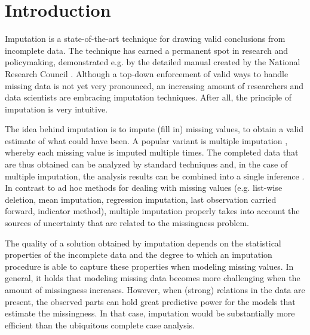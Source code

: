 \documentclass[bimj,fleqn]{w-art}
\begin{document}






\section{Introduction}

Imputation is a state-of-the-art technique for drawing valid conclusions from incomplete data. The technique has earned a permanent spot in research and policymaking, demonstrated e.g. by the detailed manual created by the National Research Council \citep*{little2012prevention}. Although a top-down enforcement of valid ways to handle missing data is not yet very pronounced, an increasing amount of researchers and data scientists are embracing imputation techniques. After all, the principle of imputation is very intuitive.

The idea behind imputation is to impute (fill in) missing values, to obtain a valid estimate of what could have been. A popular variant is multiple imputation \citep{rubi76}, whereby each missing value is imputed multiple times. The completed data that are thus obtained can be analyzed by standard techniques and, in the case of multiple imputation, the analysis results can be combined into a single inference \citep[using `Rubin's rules'][]{rubi87}. In contrast to ad hoc methods for dealing with missing values (e.g. list-wise deletion, mean imputation, regression imputation, last observation carried forward, indicator method), multiple imputation properly takes into account the sources of uncertainty that are related to the missingness problem. 

The quality of a solution obtained by imputation depends on the statistical properties of the incomplete data and the degree to which an imputation procedure is able to capture these properties when modeling missing values. In general, it holds that modeling missing data becomes more challenging when the amount of missingness increases. However, when (strong) relations in the data are present, the observed parts can hold great predictive power for the models that estimate the missingness. In that case, imputation would be substantially more efficient than the ubiquitous complete case analysis.
\end{document}
